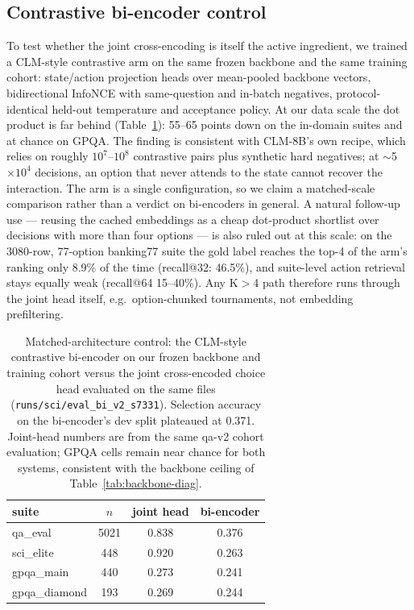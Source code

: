 \documentclass[11pt]{article}
\begin{document}
\subsection{Contrastive bi-encoder control}
\label{sec:biencoder}
To test whether the joint cross-encoding is itself the active
ingredient, we trained a CLM-style contrastive arm on the same frozen
backbone and the same training cohort: state/action projection heads
over mean-pooled backbone vectors, bidirectional InfoNCE with
same-question and in-batch negatives, protocol-identical held-out
temperature and acceptance policy. At our data scale the dot product
is far behind (Table~\ref{tab:biencoder}): 55--65 points down on the
in-domain suites and at chance on GPQA. The finding is consistent with
CLM-8B's own recipe, which relies on roughly $10^7$--$10^8$ contrastive
pairs plus synthetic hard negatives; at $\sim$5$\times 10^4$ decisions,
an option that never attends to the state cannot recover the
interaction. The arm is a single configuration, so we claim a
matched-scale comparison rather than a verdict on bi-encoders in
general. A natural follow-up use --- reusing the cached embeddings as
a cheap dot-product shortlist over decisions with more than four
options --- is also ruled out at this scale: on the 3080-row,
77-option banking77 suite the gold label reaches the top-4 of the
arm's ranking only 8.9\% of the time (recall@32: 46.5\%), and
suite-level action retrieval stays equally weak (recall@64
15--40\%). Any K$>$4 path therefore runs through the joint head
itself, e.g.\ option-chunked tournaments, not embedding prefiltering.

\begin{table}[htbp]
\centering\small
\begin{tabular}{lccc}
\toprule
suite & $n$ & joint head & bi-encoder \\
\midrule
qa\_eval      & 5021 & 0.838 & 0.376 \\
sci\_elite    & 448  & 0.920 & 0.263 \\
gpqa\_main    & 440  & 0.273 & 0.241 \\
gpqa\_diamond & 193  & 0.269 & 0.244 \\
\bottomrule
\end{tabular}
\caption{Matched-architecture control: the CLM-style contrastive
bi-encoder on our frozen backbone and training cohort versus the joint
cross-encoded choice head evaluated on the same files
(\texttt{runs/sci/eval\_bi\_v2\_s7331}). Selection accuracy on the
bi-encoder's dev split plateaued at 0.371. Joint-head numbers are from
the same qa-v2 cohort evaluation; GPQA cells remain near chance for
both systems, consistent with the backbone ceiling of
Table~\ref{tab:backbone-diag}.}
\label{tab:biencoder}
\end{table}
\end{document}
